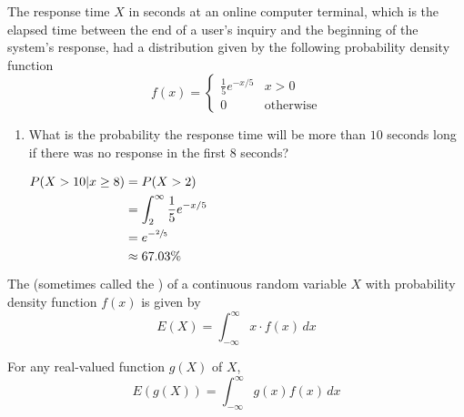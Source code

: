 \begin{example}[MMSA Ex. 4.30]
    The response time $X$ in seconds at an online computer terminal, which is the elapsed time between the end of a user's inquiry and the beginning of the system's response, had a distribution given by the following probability density function $$f(x) = \begin{cases} \frac{1}{5}e^{-x/5} & x > 0 \\ 0 & \text{otherwise} \end{cases}$$

    \begin{center}
    \end{center}

    \begin{enumerate}[label=\alph*)]
        \item What is the probability the response time will be more than $10$ seconds long if there was no response in the first $8$ seconds?

        $\begin{aligned}[t]
            P(X > 10 | x \ge 8) & = P(X > 2)                           \\ 
                                & = \int_2^\infty \frac{1}{5} e^{-x/5} \\
                                & = e^{-\sfrac{2}{5}}                  \\
                                & \approx 67.03 \%
        \end{aligned}$
    \end{enumerate}
\end{example}

\begin{definition}
    The  (sometimes called the ) of a continuous random variable $X$ with probability density function $f(x)$ is given by $$E(X) = \int_{-\infty}^\infty x \cdot f(x) \,dx$$ 

    For any real-valued function $g(X)$ of $X$, $$E(g(X)) = \int_{-\infty}^\infty g(x) f(x) \,dx$$
\end{definition}

